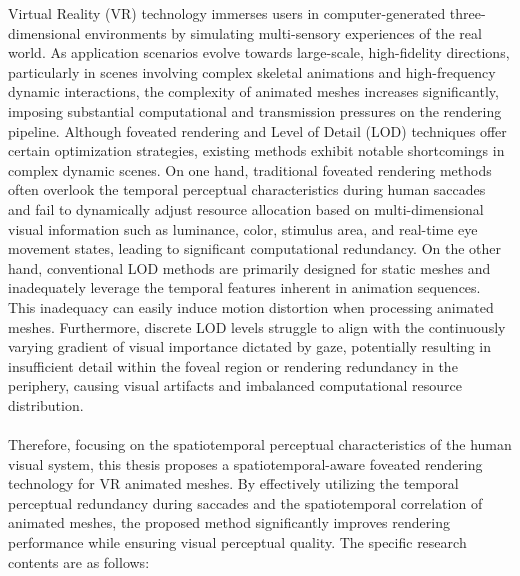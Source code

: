\begin{englishabstract}
Virtual Reality (VR) technology immerses users in computer-generated three-dimensional environments by simulating multi-sensory experiences of the real world. As application scenarios evolve towards large-scale, high-fidelity directions, particularly in scenes involving complex skeletal animations and high-frequency dynamic interactions, the complexity of animated meshes increases significantly, imposing substantial computational and transmission pressures on the rendering pipeline. Although foveated rendering and Level of Detail (LOD) techniques offer certain optimization strategies, existing methods exhibit notable shortcomings in complex dynamic scenes.
On one hand, traditional foveated rendering methods often overlook the temporal perceptual characteristics during human saccades and fail to dynamically adjust resource allocation based on multi-dimensional visual information such as luminance, color, stimulus area, and real-time eye movement states, leading to significant computational redundancy. On the other hand, conventional LOD methods are primarily designed for static meshes and inadequately leverage the temporal features inherent in animation sequences. This inadequacy can easily induce motion distortion when processing animated meshes. Furthermore, discrete LOD levels struggle to align with the continuously varying gradient of visual importance dictated by gaze, potentially resulting in insufficient detail within the foveal region or rendering redundancy in the periphery, causing visual artifacts and imbalanced computational resource distribution.
\\~\\
Therefore, focusing on the spatiotemporal perceptual characteristics of the human visual system, this thesis proposes a spatiotemporal-aware foveated rendering technology for VR animated meshes. By effectively utilizing the temporal perceptual redundancy during saccades and the spatiotemporal correlation of animated meshes, the proposed method significantly improves rendering performance while ensuring visual perceptual quality. The specific research contents are as follows:
\\~\\

\end{englishabstract}
